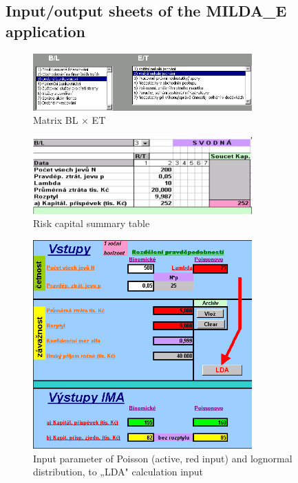 \documentclass{article}
\begin{document}
\subsection{Input/output sheets of the MILDA\_E application}

\begin{figure}[H]
  \caption{Matrix BL $\times$ ET}
  \centering
    \includegraphics[width=0.75\textwidth]{matice}
\end{figure}


\begin{figure}[H]
  \caption{Risk capital summary table}
  \centering
    \includegraphics[width=0.75\textwidth]{tabulka}
\end{figure}

\begin{figure}[H]
    \caption{Input parameter of Poisson (active, red input) and lognormal distribution, to „LDA" calculation input}
  \centering
    \includegraphics[width=0.75\textwidth]{vstup}

\end{figure}
\end{document}
